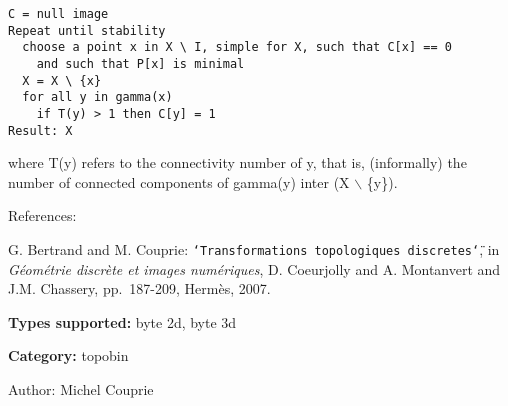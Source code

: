 \begin{footnotesize}\begin{verbatim}
C = null image
Repeat until stability
  choose a point x in X \ I, simple for X, such that C[x] == 0 
    and such that P[x] is minimal
  X = X \ {x}
  for all y in gamma(x)
    if T(y) > 1 then C[y] = 1
Result: X
\end{verbatim}
\end{footnotesize}


where T(y) refers to the connectivity number of y, that is, (informally) the number of connected components of gamma(y) inter (X $\backslash$ \{y\}).

References:\par
 [BC07] G. Bertrand and M. Couprie: {\tt \char`\"{}Transformations topologiques discretes\char`\"{}}, in {\em G\'{e}om\'{e}trie discr\`{e}te et images num\'{e}riques\/}, D. Coeurjolly and A. Montanvert and J.M. Chassery, pp.~187-209, Herm\`{e}s, 2007.\par


{\bf Types supported:} byte 2d, byte 3d

{\bf Category:} topobin

\begin{Desc}
\item[Author:]Michel Couprie \end{Desc}
